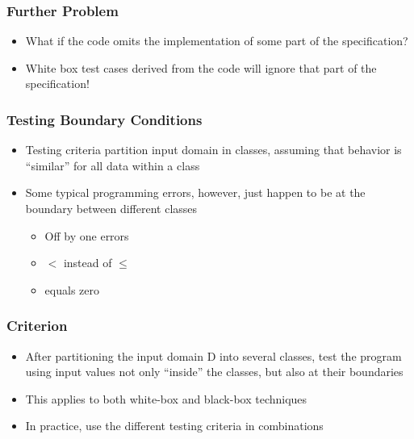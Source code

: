 \documentclass[t,12pt,numbers,fleqn]{beamer}
\begin{document}

\begin{frame}
\frametitle{Further Problem}

\begin{itemize}
\item What if the code omits the implementation of some part of the specification?
\item White box test cases derived from the code will ignore that part of the specification!
\end{itemize}

\end{frame}


\begin{frame}
\frametitle{Testing Boundary Conditions}

\begin{itemize}

\item Testing criteria partition input domain in classes, assuming that behavior
  is ``similar'' for all data within a class
\item Some typical programming errors, however, just happen to be at the
  boundary between different classes
\begin{itemize}
\item Off by one errors
\item $<$ instead of $\leq$
\item equals zero
\end{itemize}
\end{itemize}

\end{frame}


\begin{frame}
\frametitle{Criterion}

\begin{itemize}

\item After partitioning the input domain D into several classes, test the
  program using input values not only ``inside'' the classes, but also at their
  boundaries
\item This applies to both white-box and black-box techniques
\item In practice, use the different testing criteria in combinations
\end{itemize}

\end{frame}
\end{document}
